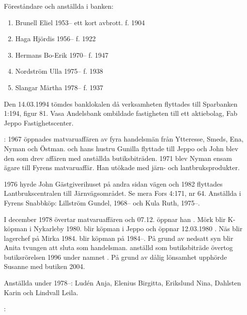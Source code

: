 Föreståndare och anställda i banken:
\begin{enumerate}
  \item Brunell Eliel     1953-- ett kort avbrott.  f. 1904
  \item Haga Hjördis      1956--		                 f. 1922
  \item Hermans Bo-Erik   1970--		                 f. 1947
  \item Nordström Ulla    1975--		                 f. 1938
  \item Slangar Märtha    1978--		                 f. 1937
\end{enumerate}
Den 14.03.1994 tömdes banklokalen då verksamheten flyttades till Sparbanken 1:194, figur 81. Vasa Andelsbank ombildade fastigheten till ett aktiebolag, Fab Jeppo	Fastighetscenter.


:
1967 öppnades matvaruaffären  av fyra handelsmän från Ytteresse, Smeds, Ena, Nyman och Östman.  och hans hustru Gunilla flyttade till Jeppo och John blev den som drev affären med anställda butiksbiträden. 1971 blev Nyman ensam ägare till Fyrens matvaruaffär. Han utökade med järn- och lantbruksprodukter.

1976 hyrde John Gästgiverihuset på andra sidan vägen och 1982 flyttades Lantbrukscentralen till Järnvägsområdet. Se mera Fors 4:171, nr 64.	Anställda i Fyrens Snabbköp:	Lillström Gundel,	1968--	och	Kula Ruth, 1975--.

I december 1978 övertar  matvaruaffären och 07.12. öppnar han . Mörk blir K-köpman i Nykarleby 1980.  blir köpman i Jeppo och öppnar 12.03.1980 . Näs blir lagerchef på Mirka 1984.  blir köpman på 	 1984--. På grund av nedsatt syn blir Anita tvungen att sluta	som handelsman.  anställd som butiksbiträde övertog	butiksrörelsen 1996 under namnet . På grund av dålig lönsamhet upphörde Susanne med butiken 2004.

Anställda under 1978--: Ludén Anja, Elenius Birgitta, Erikslund Nina, Dahlsten Karin och Lindvall Leila.


:

